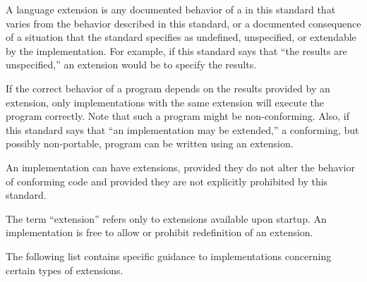 
 
A language extension is any documented  behavior
of a  in this standard that varies from the
behavior described in this standard, or a documented consequence of a
situation that the standard specifies as undefined, unspecified, or
extendable by the implementation.  For example, if this standard says
that ``the results are unspecified,'' an extension would be to specify
the results.

If the correct behavior of a program depends on the results provided
by an extension, only implementations with the same extension will
execute the program correctly.  Note that such a program might be
non-conforming.  Also, if this standard says that ``an implementation
may be extended,'' a conforming, but possibly non-portable, program
can be written using an extension.

An implementation can have extensions, provided they do not alter the
behavior of conforming code and provided they are not explicitly
prohibited by this standard.

          
The term ``extension'' refers only to extensions available upon
startup.  An implementation is free to allow or prohibit redefinition
of an extension.

The following list contains specific guidance to implementations 
concerning certain types of extensions.
\beginlist
%
 
% 
%
% 
%
% 
% 

